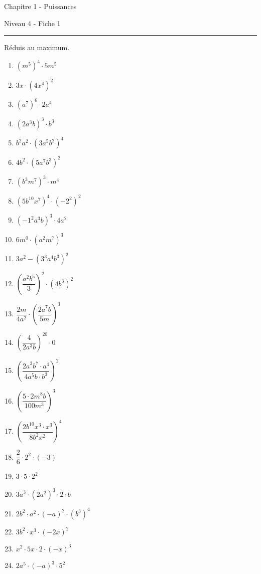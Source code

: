 \documentclass[12pt,parskip=half-, twoside=semi]{scrartcl}
\begin{document}
\newpage
\begin{center}
  \bfseries
  \begin{Huge}
    Chapitre 1 - Puissances
  \end{Huge}
  \smallbreak
  \begin{large}
    Niveau 4  - Fiche 1
  \end{large}
  \smallbreak
  \rule[10pt]{.5\linewidth}{1 pt}
\end{center}

\setcounter{exercise}{0}

\begin{exercise}
Réduis au maximum.
\begin{enumerate}[cols=3]
  
\item \(\left( m^{5} \right)^{4} \cdot 5m^{5}\)
\item \({3x \cdot \left( 4x^{4} \right)}^{2}\)
\item \(\left( a^{7} \right)^{6} \cdot 2a^{4}\)
\item \(\left( 2a^{3}b \right)^{3} \cdot b^{3}\)
\item \({b^{2}a^{2} \cdot \left( 3a^{5}b^{2} \right)}^{4}\)
\item \({4b^{2} \cdot \left( 5a^{7}b^{3} \right)}^{2}\)
\item \(\left( b^{3}m^{7} \right)^{3} \cdot m^{4}\)
\item \(\left( 5b^{10}x^{7} \right)^{4} \cdot \left( - 2^{2} \right)^{2}\)
\item \(\left( - 1^{2}a^{3}b \right)^{3} \cdot 4a^{2}\)
\item \(6m^{0} \cdot \left( a^{2}m^{7} \right)^{3}\)
\item \(3a^{2} - \left( 3^{3}a^{4}b^{3} \right)^{2}\)
\item \(\left( \dfrac{a^{2}b^{5}}{3} \right)^{2} \cdot \left( 4b^{3} \right)^{2}\)
\item \(\dfrac{2m}{4a^{2}} \cdot \left( \dfrac{{2a}^{7}b}{5m} \right)^{3}\)
\item \(\left( \dfrac{4}{2a^{3}b} \right)^{20} \cdot 0\)
\item \(\left( \dfrac{{2a}^{3}b^{7} \cdot a^{4}}{4a^{5}b \cdot b^{3}} \right)^{2}\)
\item \(\left( \dfrac{{5 \cdot 2m}^{8}b}{100m^{3}} \right)^{3}\)
\item \(\left( \dfrac{{2b}^{10}x^{3} \cdot x^{3}}{8b^{2}x^{2}} \right)^{4}\)
\item \(\dfrac{2}{6} \cdot 2^{2} \cdot ( - 3)\)
\item \(3 \cdot 5 \cdot 2^{2}\)
\item \({3a}^{3} \cdot \left( 2a^{2} \right)^{3} \cdot 2 \cdot b\)
\item \(2b^{2} \cdot a^{2} \cdot ( - a)^{2} \cdot \left( b^{3} \right)^{4}\)
\item \({3b}^{2} \cdot x^{3} \cdot ( - 2x)^{2}\)
\item \(x^{2} \cdot 5x \cdot 2 \cdot ( - x)^{3}\)
\item \(2a^{5} \cdot ( - a)^{3} \cdot 5^{2}\)


\end{enumerate}
\end{exercise}
\end{document}
